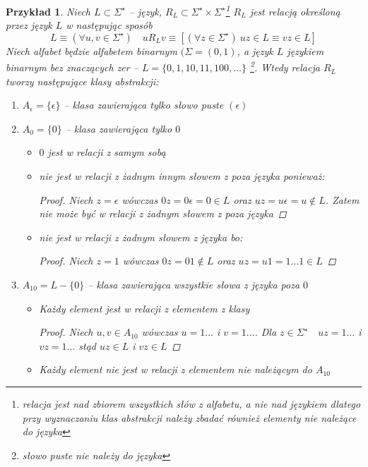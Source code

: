 \documentclass[12pt,a4paper]{article}
\newtheorem{przyklad}{Przykład}
\theoremstyle{definition}
\begin{document}
	\begin{przyklad}
		Niech $L \subset \Sigma^\star$ -- język, $R_L \subset \Sigma^\star \times \Sigma^\star$\footnote{relacja jest nad zbiorem wszystkich słów z alfabetu,
		a nie nad językiem dlatego przy wyznaczaniu klas abstrakcji należy zbadać również elementy nie należące do języka}
		$R_L$ jest relacją określoną przez język $L$ w następując sposób $$L \equiv (\forall u,v \in \Sigma^\star) \quad uR_Lv \equiv [(\forall z\in \Sigma^\star) ~
		uz \in L \equiv vz \in L ]  $$
		Niech alfabet będzie alfabetem binarnym $(\Sigma = (0, 1)$, a język $L$ językiem binarnym bez znaczących zer -- $L = \{0, 1, 10, 11, 100, \dots \}$
		\footnote{słowo puste nie należy do języka}. Wtedy relacja $R_L$ tworzy następujące klasy abstrakcji:
		\begin{enumerate}
			\item $A_\epsilon = \{\epsilon\}$ -- klasa zawierająca tylko słowo puste $(\epsilon)$ 
			\item $A_0 = \{0\}$ -- klasa zawierająca tylko $0$
				\begin{itemize}
					\item $0$ jest w relacji z samym sobą
					\item nie jest w relacji z żadnym innym słowem z poza języka ponieważ:
					\begin{proof}
						Niech $z = \epsilon$ wówczas $0z = 0\epsilon = 0 \in L$ oraz $uz = u\epsilon = u \not\in L$. Zatem nie może być w relacji z żadnym 
						słowem z poza języka
					\end{proof}
					\item nie jest w relacji z żadnym słowem z języka bo:
					\begin{proof}
						Niech $z = 1$ wówczas $0z = 01 \not\in L$ oraz $uz = u1 = 1\dots 1 \in L$
					\end{proof}
				\end{itemize}
			\item $A_{10} = L - \{0\}$ -- klasa zawierająca wszystkie słowa z języka poza $0$
				\begin{itemize}
					\item Każdy element jest w relacji z elementem z klasy
					\begin{proof}
						Niech $u, v \in A_{10}$ wówczas $u = 1\dots$ i $v = 1\dots$. Dla $z \in \Sigma^\star \quad uz = 1\dots$ i $vz = 1\dots$
						stąd $uz \in L$ i $vz \in L$
					\end{proof}
					\item Każdy element nie jest w relacji z elementem nie należącym do $A_{10}$

\end{itemize}
\end{enumerate}
\end{przyklad}
\end{document}
